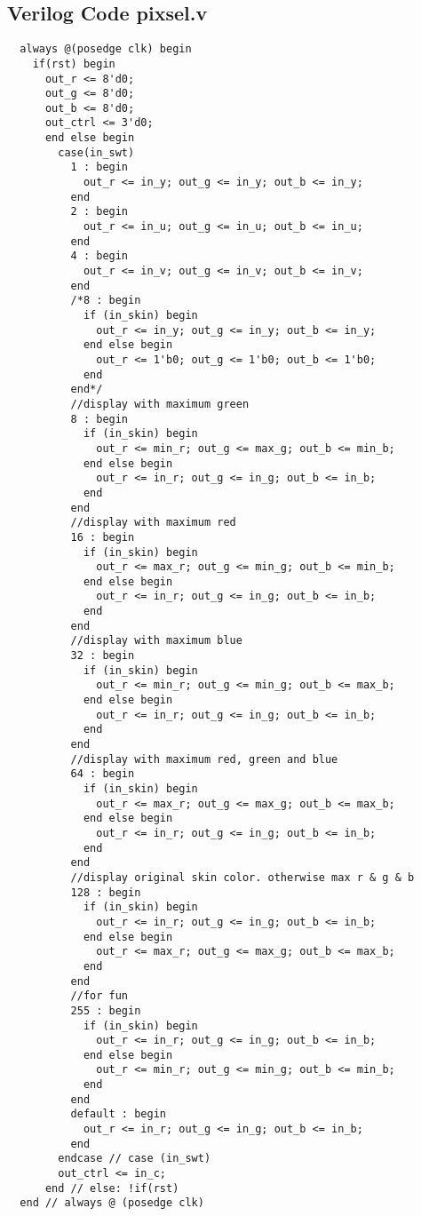 \documentclass[12pt,fleqn]{article}
\begin{document}
\subsection{Verilog Code pixsel.v}
{\linespread{0.75}
\begin{lstlisting}
  always @(posedge clk) begin
    if(rst) begin
      out_r <= 8'd0;
      out_g <= 8'd0;
      out_b <= 8'd0;
      out_ctrl <= 3'd0;
      end else begin
        case(in_swt)
          1 : begin
            out_r <= in_y; out_g <= in_y; out_b <= in_y;
          end
          2 : begin
            out_r <= in_u; out_g <= in_u; out_b <= in_u;
          end
          4 : begin
            out_r <= in_v; out_g <= in_v; out_b <= in_v;
          end
          /*8 : begin
            if (in_skin) begin
              out_r <= in_y; out_g <= in_y; out_b <= in_y;
            end else begin
              out_r <= 1'b0; out_g <= 1'b0; out_b <= 1'b0;
            end
          end*/
          //display with maximum green
          8 : begin
            if (in_skin) begin
              out_r <= min_r; out_g <= max_g; out_b <= min_b;
            end else begin
              out_r <= in_r; out_g <= in_g; out_b <= in_b;
            end
          end
          //display with maximum red
          16 : begin
            if (in_skin) begin
              out_r <= max_r; out_g <= min_g; out_b <= min_b;
            end else begin
              out_r <= in_r; out_g <= in_g; out_b <= in_b;
            end
          end
          //display with maximum blue
          32 : begin
            if (in_skin) begin
              out_r <= min_r; out_g <= min_g; out_b <= max_b;
            end else begin
              out_r <= in_r; out_g <= in_g; out_b <= in_b;
            end
          end
          //display with maximum red, green and blue
          64 : begin
            if (in_skin) begin
              out_r <= max_r; out_g <= max_g; out_b <= max_b;
            end else begin
              out_r <= in_r; out_g <= in_g; out_b <= in_b;
            end
          end
          //display original skin color. otherwise max r & g & b
          128 : begin
            if (in_skin) begin
              out_r <= in_r; out_g <= in_g; out_b <= in_b;
            end else begin
              out_r <= max_r; out_g <= max_g; out_b <= max_b;
            end
          end
          //for fun
          255 : begin
            if (in_skin) begin
              out_r <= in_r; out_g <= in_g; out_b <= in_b;
            end else begin
              out_r <= min_r; out_g <= min_g; out_b <= min_b;
            end
          end
          default : begin
            out_r <= in_r; out_g <= in_g; out_b <= in_b;
          end
        endcase // case (in_swt)
        out_ctrl <= in_c;
      end // else: !if(rst)
  end // always @ (posedge clk)
\end{lstlisting}
\par}
\end{document}
